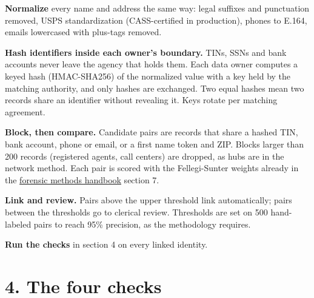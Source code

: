 \documentclass[letterpaper,11pt]{article}
\begin{document}
\textbf{Normalize} every name and address the same way: legal suffixes
and punctuation removed, USPS standardization (CASS-certified in
production), phones to E.164, emails lowercased with plus-tags removed.

\textbf{Hash identifiers inside each owner's boundary.} TINs, SSNs and
bank accounts never leave the agency that holds them. Each data owner
computes a keyed hash (HMAC-SHA256) of the normalized value with a key
held by the matching authority, and only hashes are exchanged. Two equal
hashes mean two records share an identifier without revealing it. Keys
rotate per matching agreement.

\textbf{Block, then compare.} Candidate pairs are records that share a
hashed TIN, bank account, phone or email, or a first name token and ZIP.
Blocks larger than 200 records (registered agents, call centers) are
dropped, as hubs are in the network method. Each pair is scored with the
Fellegi-Sunter weights already in the
\href{forensic_methods.pdf}{forensic methods handbook} section 7.

\textbf{Link and review.} Pairs above the upper threshold link
automatically; pairs between the thresholds go to clerical review.
Thresholds are set on 500 hand-labeled pairs to reach 95\% precision, as
the methodology requires.

\textbf{Run the checks} in section 4 on every linked identity.

\hypertarget{the-four-checks}{%
\section*{4. The four checks}\label{the-four-checks}}
\end{document}
